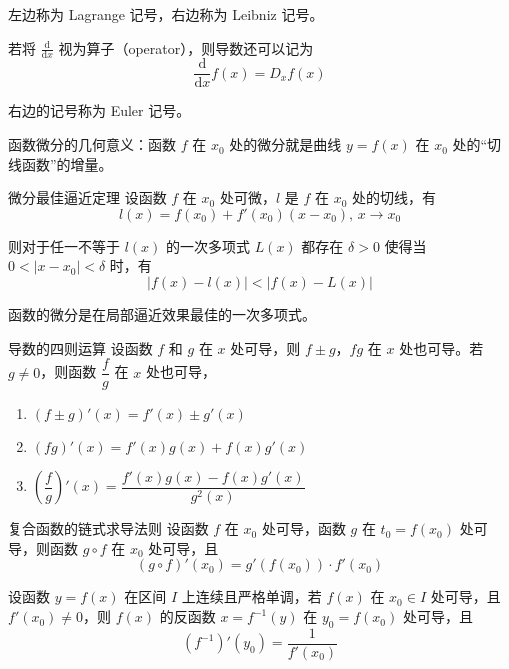 左边称为 Lagrange 记号，右边称为 Leibniz 记号。

若将 $\displaystyle \frac{\mathrm{d}}{\mathrm{d}x}$ 视为算子（operator），则导数还可以记为
\[\frac{\mathrm{d}}{\mathrm{d}x}f(x) = D_{x}f(x)\]

右边的记号称为 Euler 记号。

函数微分的几何意义：函数 $f$ 在 $x_0$ 处的微分就是曲线 $y = f(x)$ 在 $x_0$ 处的“切线函数”的增量。

\begin{theorem}{微分最佳逼近定理}
    设函数 $f$ 在 $x_0$ 处可微，$l$ 是 $f$ 在 $x_0$ 处的切线，有
    \[l(x) = f(x_0) + f'(x_0)(x - x_0),\, x\to x_0\]

    则对于任一不等于 $l(x)$ 的一次多项式 $L(x)$ 都存在 $\delta > 0$ 使得当 $0 < |x - x_0| < \delta$ 时，有
    \[|f(x) - l(x)| < |f(x) - L(x)|\]
\end{theorem}
函数的微分是在局部逼近效果最佳的一次多项式。

\begin{theorem}{导数的四则运算}
    设函数 $f$ 和 $g$ 在 $x$ 处可导，则 $f \pm g$，$fg$ 在 $x$ 处也可导。若 $g \ne 0$，则函数 $\dfrac{f}{g}$ 在 $x$ 处也可导，
    \begin{enumerate}
        \item $(f \pm g)'(x) = f'(x) \pm g'(x)$
        \item $(fg)'(x) = f'(x)g(x) + f(x)g'(x)$
        \item $\left(\dfrac{f}{g}\right)'(x) = \dfrac{f'(x)g(x) - f(x)g'(x)}{g^2(x)}$
    \end{enumerate}
\end{theorem}

\begin{theorem}{复合函数的链式求导法则}
    设函数 $f$ 在 $x_0$ 处可导，函数 $g$ 在 $t_0 = f(x_0)$ 处可导，则函数 $g \circ f$ 在 $x_0$ 处可导，且
    \[(g \circ f)'(x_0) = g'(f(x_0)) \cdot f'(x_0)\]
\end{theorem}

\begin{theorem}
    设函数 $y = f(x)$ 在区间 $I$ 上连续且严格单调，若 $f(x)$ 在 $x_0\in I$ 处可导，且 $f'(x_0) \ne 0$，则 $f(x)$ 的反函数 $x = f^{-1}(y)$ 在 $y_0 = f(x_0)$ 处可导，且
    \[\left(f^{-1}\right)'(y_0) = \dfrac{1}{f'(x_0)}\]
\end{theorem}

